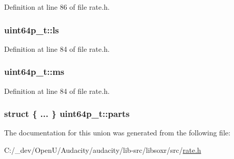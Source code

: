 Definition at line 86 of file rate.\+h.

\subsubsection[{\texorpdfstring{ls}{ls}}]{ uint64p\+\_\+t\+::ls}\hypertarget{unionuint64p__t_a897bb38196ef14af0eeeea93d1f08f7e}{}\label{unionuint64p__t_a897bb38196ef14af0eeeea93d1f08f7e}


Definition at line 84 of file rate.\+h.

\subsubsection[{\texorpdfstring{ms}{ms}}]{ uint64p\+\_\+t\+::ms}\hypertarget{unionuint64p__t_a5c67766ff00a31ed0d782d7e1dff807a}{}\label{unionuint64p__t_a5c67766ff00a31ed0d782d7e1dff807a}


Definition at line 84 of file rate.\+h.

\subsubsection[{\texorpdfstring{parts}{parts}}]{\setlength{\rightskip}{0pt plus 5cm}struct \{ ... \}   uint64p\+\_\+t\+::parts}\hypertarget{unionuint64p__t_a58b4b4781074ee0c7df95e767338da74}{}\label{unionuint64p__t_a58b4b4781074ee0c7df95e767338da74}


The documentation for this union was generated from the following file\+:\begin{DoxyCompactItemize}
\item 
C\+:/\+\_\+dev/\+Open\+U/\+Audacity/audacity/lib-\/src/libsoxr/src/\hyperlink{rate_8h}{rate.\+h}\end{DoxyCompactItemize}
